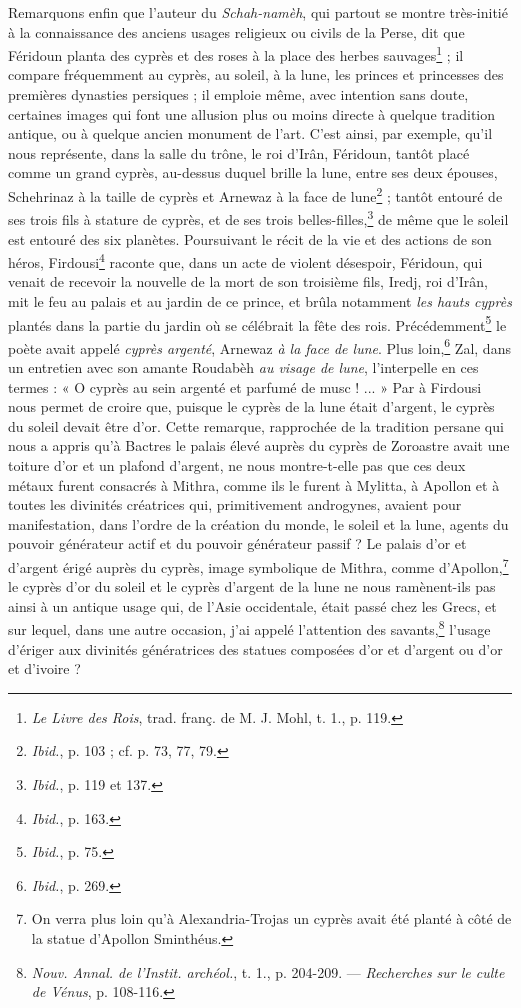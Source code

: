 \documentclass[a4paper, 11pt, oneside, polutonikogreek, french]{article}
\begin{document}
Remarquons enfin que l'auteur du \emph{Schah-namèh}, qui partout se montre très-initié à la connaissance des anciens usages religieux ou civils de la Perse, dit que Féridoun planta des cyprès et des roses à la place des herbes sauvages\footnote{\emph{Le Livre des Rois}, trad. franç. de M. J. Mohl, t. 1., p. 119.} ; il compare fréquemment au cyprès, au soleil, à la lune, les princes et princesses des premières dynasties persiques ; il emploie même, avec intention sans doute, certaines images qui font une allusion plus ou moins directe à quelque tradition antique, ou à quelque ancien monument de l'art. C'est ainsi, par exemple, qu'il nous représente, dans la salle du trône, le roi d'Irân, Féridoun, tantôt placé comme un grand cyprès, au-dessus duquel brille la lune, entre ses deux épouses, Schehrinaz à la taille de cyprès et Arnewaz à la face de lune\footnote{\emph{Ibid.}, p. 103 ; cf. p. 73, 77, 79.} ; tantôt entouré de ses trois fils à stature de cyprès, et de ses trois belles-filles,\footnote{\emph{Ibid.}, p. 119 et 137.} de même que le soleil est entouré des six planètes. Poursuivant le récit de la vie et des actions de son héros, Firdousi\footnote{\emph{Ibid.}, p. 163.} raconte que, dans un acte de violent désespoir, Féridoun, qui venait de recevoir la nouvelle de la mort de son troisième fils, Iredj, roi d'Irân, mit le feu au palais et au jardin de ce prince, et brûla notamment \emph{les hauts cyprès} plantés dans la partie du jardin où se célébrait la fête des rois. Précédemment\footnote{\emph{Ibid.}, p. 75.} le poète avait appelé \emph{cyprès argenté}, Arnewaz \emph{à la face de lune}. Plus loin,\footnote{\emph{Ibid.}, p. 269.} Zal, dans un entretien avec son amante Roudabèh \emph{au visage de lune}, l'interpelle en ces termes : « O cyprès au sein argenté et parfumé de musc ! ... » Par à Firdousi nous permet de croire que, puisque le cyprès de la lune était d'argent, le cyprès du soleil devait être d'or. Cette remarque, rapprochée de la tradition persane qui nous a appris qu'à Bactres le palais élevé auprès du cyprès de Zoroastre avait une toiture d'or et un plafond d'argent, ne nous montre-t-elle pas que ces deux métaux furent consacrés à Mithra, comme ils le furent à Mylitta, à Apollon et à toutes les divinités créatrices qui, primitivement androgynes, avaient pour manifestation, dans l'ordre de la création du monde, le soleil et la lune, agents du pouvoir générateur actif et du pouvoir générateur passif ? Le palais d'or et d'argent érigé auprès du cyprès, image symbolique de Mithra, comme d'Apollon,\footnote{On verra plus loin qu'à Alexandria-Trojas un cyprès avait été planté à côté de la statue d'Apollon Sminthéus.} le cyprès d'or du soleil et le cyprès d'argent de la lune ne nous ramènent-ils pas ainsi à un antique usage qui, de l'Asie occidentale, était passé chez les Grecs, et sur lequel, dans une autre occasion, j'ai appelé l'attention des savants,\footnote{\emph{Nouv. Annal. de l'Instit. archéol.}, t. 1., p. 204-209. --- \emph{Recherches sur le culte de Vénus}, p. 108-116.} l'usage d'ériger aux divinités génératrices des statues composées d'or et d'argent ou d'or et d'ivoire ?
\end{document}
